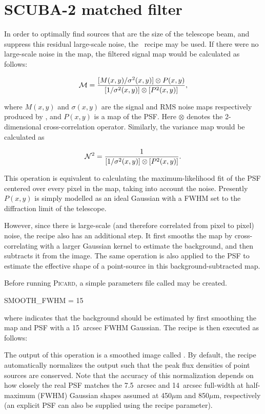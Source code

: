 \chapter{SCUBA-2 matched filter}
\label{app:mf}

In order to optimally find sources that are the size of the telescope
beam, and suppress this residual large-scale noise, the \picard\
recipe  may be used. If there were
no large-scale noise in the map, the filtered signal map would be
calculated as follows:

\begin{equation}
  {\cal{M}} = \frac{[M(x,y)/\sigma^2(x,y)] \otimes P(x,y)}
  {[1/\sigma^2(x,y)] \otimes [P^2(x,y)]},
\end{equation}

where $M(x,y)$ and $\sigma(x,y)$ are the signal and RMS noise maps
respectively produced by \smurf, and $P(x,y)$ is a map of the
PSF. Here \(\otimes\)
denotes the 2-dimensional cross-correlation operator. Similarly, the
variance map would be calculated as

\begin{equation}
  {\cal{N}}^2 = \frac{1}{[1/\sigma^2(x,y)] \otimes [P^2(x,y)]}.
\end{equation}

This operation is equivalent to calculating the maximum-likelihood fit
of the PSF centered over every pixel in the map, taking into account
the noise. Presently $P(x,y)$ is simply modelled as an ideal Gaussian
with a FWHM set to the diffraction limit of the telescope.

However, since there is large-scale (and therefore correlated from
pixel to pixel) noise, the recipe also has an additional step. It
first smooths the map by cross-correlating with a larger Gaussian
kernel to estimate the background, and then subtracts it from the
image. The same operation is also applied to the PSF to estimate the
effective shape of a point-source in this background-subtracted map.

Before running \textsc{Picard}, a simple parameters file called
 may be created.
\begin{terminalv}
SMOOTH_FWHM = 15
\end{terminalv}
%
where  indicates that the background should
be estimated by first smoothing the map and PSF with a 15~arcsec FWHM
Gaussian. The recipe is then executed as follows:
%
\begin{terminalv}
\end{terminalv}
%
The output of this operation is a smoothed image called
. By default, the recipe automatically normalizes
the output such that the peak flux densities of point sources are
conserved. Note that the accuracy of this normalization depends on how
closely the real PSF matches the 7.5~arcsec and 14~arcsec full-width
at half-maximum (FWHM) Gaussian shapes assumed at 450$\mu$m and
850$\mu$m, respectively (an explicit PSF can also be supplied using
the \param{PSF\_MATCHFILTER} recipe parameter).



